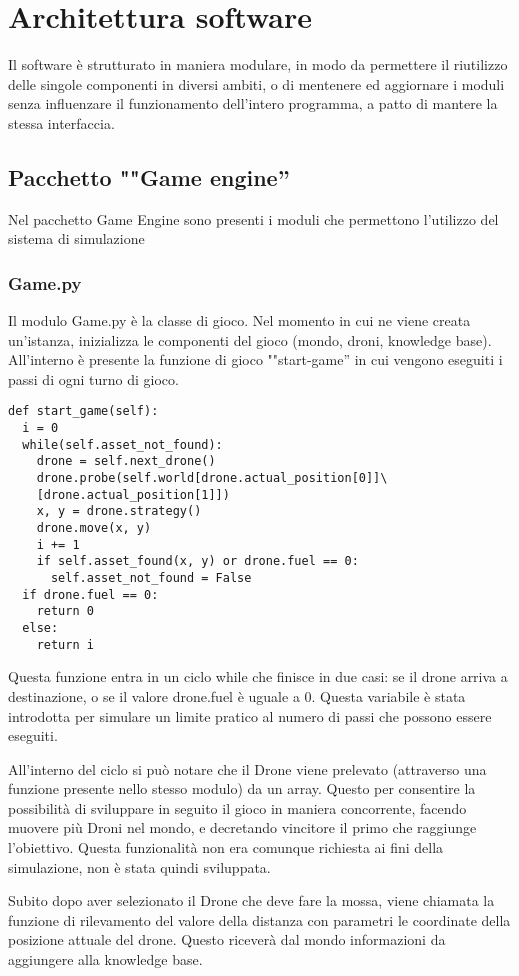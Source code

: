 \section{Architettura software}
Il software è strutturato in maniera modulare, in modo da permettere il riutilizzo delle singole componenti in diversi ambiti, o di mentenere ed aggiornare i moduli senza influenzare il funzionamento dell'intero programma, a patto di mantere la stessa interfaccia.

\subsection{Pacchetto ""Game engine''}
Nel pacchetto Game Engine sono presenti i moduli che permettono l'utilizzo del sistema di simulazione

\subsubsection{Game.py}
Il modulo Game.py è la classe di gioco. Nel momento in cui ne viene creata un'istanza, inizializza le componenti del gioco (mondo, droni, knowledge base). All'interno è presente la funzione di gioco ""start-game'' in cui vengono eseguiti i passi di ogni turno di gioco. 
\begin{verbatim}
def start_game(self):
  i = 0
  while(self.asset_not_found):
    drone = self.next_drone()
    drone.probe(self.world[drone.actual_position[0]]\
    [drone.actual_position[1]])
    x, y = drone.strategy()
    drone.move(x, y)
    i += 1
    if self.asset_found(x, y) or drone.fuel == 0:
      self.asset_not_found = False
  if drone.fuel == 0:
    return 0
  else:
    return i
\end{verbatim}
Questa funzione entra in un ciclo while che finisce in due casi: se il drone arriva a destinazione, o se il valore drone.fuel è uguale a 0. Questa variabile è stata introdotta per simulare un limite pratico al numero di passi che possono essere eseguiti. 

All'interno del ciclo si può notare che il Drone viene prelevato (attraverso una funzione presente nello stesso modulo) da un array. Questo per consentire la possibilità di sviluppare in seguito il gioco in maniera concorrente, facendo muovere più Droni nel mondo, e decretando vincitore il primo che raggiunge l'obiettivo. Questa funzionalità non era comunque richiesta ai fini della simulazione, non è stata quindi sviluppata.

Subito dopo aver selezionato il Drone che deve fare la mossa, viene chiamata la funzione di rilevamento del valore della distanza con parametri le coordinate della posizione attuale del drone. Questo riceverà dal mondo informazioni da aggiungere alla knowledge base. 

